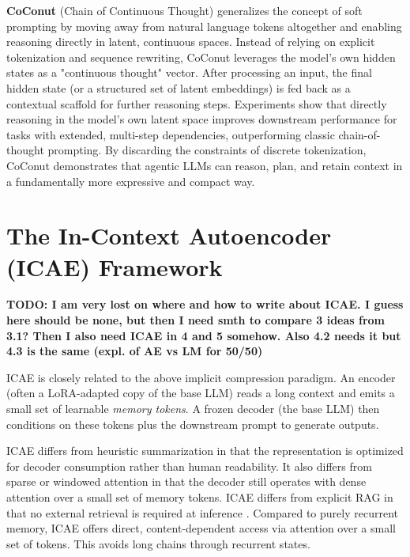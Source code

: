 \textbf{CoConut} (Chain of Continuous Thought) \cite{coconut_placeholder,arxiv_2412_06769} generalizes the concept of soft prompting by moving away from natural language tokens altogether and enabling reasoning directly in latent, continuous spaces.
Instead of relying on explicit tokenization and sequence rewriting, CoConut leverages the model's own hidden states as a "continuous thought" vector.
After processing an input, the final hidden state (or a structured set of latent embeddings) is fed back as a contextual scaffold for further reasoning steps.
Experiments show that directly reasoning in the model's own latent space improves downstream performance for tasks with extended, multi-step dependencies, outperforming classic chain-of-thought prompting.
By discarding the constraints of discrete tokenization, CoConut demonstrates that agentic LLMs can reason, plan, and retain context in a fundamentally more expressive and compact way.


\section{The In-Context Autoencoder (ICAE) Framework}

\textbf{TODO: I am very lost on where and how to write about ICAE. 
I guess here should be none, but then I need smth to compare 3 ideas from 3.1?
Then I also need ICAE in 4 and 5 somehow. Also 4.2 needs it but 4.3 is the same (expl. of AE vs LM for 50/50)}

ICAE \cite{ge_-context_2024} is closely related to the above implicit compression paradigm.
An encoder (often a LoRA-adapted copy of the base LLM) reads a long context and emits a small set of learnable \emph{memory tokens}.
A frozen decoder (the base LLM) then conditions on these tokens plus the downstream prompt to generate outputs.


ICAE differs from heuristic summarization in that the representation is optimized for decoder consumption rather than human readability.
It also differs from sparse or windowed attention in that the decoder still operates with dense attention over a small set of memory tokens.
ICAE differs from explicit RAG in that no external retrieval is required at inference \cite{beltagy_longformer_2020,zaheer_bigbird_2020,lewis_rag_2020}.
Compared to purely recurrent memory, ICAE offers direct, content-dependent access via attention over a small set of tokens.
This avoids long chains through recurrent states.



